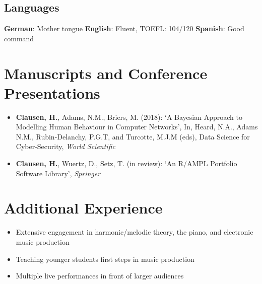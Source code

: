 \documentclass[11pt,a4paper,roman]{moderncv}   %
\begin{document}
{{{\vspace{0.1cm}
\subsection{Languages}
\textbf{German}: Mother tongue \hspace{20cm} 
\linebreak \textbf{English}: Fluent, TOEFL: 104/120 \hspace{20cm} 
\linebreak \textbf{Spanish}: Good command \hspace{20cm}

\section{Manuscripts and Conference Presentations}

\begin{itemize}
\item \textbf{Clausen, H.}, Adams, N.M., Briers, M. (2018): ‘A Bayesian Approach to Modelling Human Behaviour in Computer Networks’, In, Heard, N.A., Adams N.M., Rubin-Delanchy, P.G.T, and Turcotte, M.J.M (eds), Data Science for Cyber-Security, \textit{World Scientific}


\item \textbf{Clausen, H.}, Wuertz, D., Setz, T. (in review): ‘An R/AMPL Portfolio Software Library’, \textit{Springer}
\end{itemize}



\section{Additional Experience}

\vspace{0.2cm}

\vspace{-0.25cm}
\begin{itemize}%
\item Extensive engagement in harmonic/melodic theory, the piano,  \hspace{8.5cm} \linebreak and electronic music production
\item Teaching younger students first steps in music production
\item Multiple live performances in front of larger audiences


\end{itemize}}}}
\end{document}
